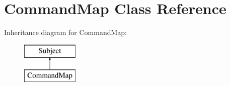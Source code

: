 \hypertarget{class_command_map}{}\section{Command\+Map Class Reference}
\label{class_command_map}
Inheritance diagram for Command\+Map\+:\begin{figure}[H]
\begin{center}
\leavevmode
\includegraphics[height=2.000000cm]{class_command_map}
\end{center}
\end{figure}
